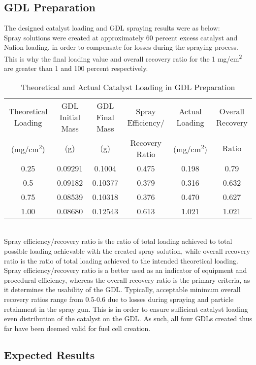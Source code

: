 \documentclass{article}
\begin{document}
	\subsection{GDL Preparation}
	The designed catalyst loading and GDL spraying results were as below:\\
Spray solutions were created at approximately 60 percent excess catalyst and Nafion loading, in order to compensate for losses during the spraying process. This is why the final loading value and overall recovery ratio for the 1 mg/cm\textsuperscript{2} are greater than 1 and 100 percent respectively.
\begin{table}[ht]
\caption{Theoretical and Actual Catalyst Loading in GDL Preparation}
\centering
\begin{tabular}{c c c c c c}
\hline\hline
Theoretical Loading & GDL Initial Mass & GDL Final Mass  & Spray Efficiency/ & Actual Loading & Overall Recovery \\
(mg/cm\textsuperscript{2}) & (g) & (g) & Recovery Ratio & (mg/cm\textsuperscript{2}) & Ratio\\
\hline
0.25 & 0.09291 & 0.1004 & 0.475 & 0.198 & 0.79\\
0.5 & 0.09182 & 0.10377 & 0.379 & 0.316 & 0.632\\
0.75 & 0.08539 & 0.10318 & 0.376 & 0.470 & 0.627\\
1.00 & 0.08680 & 0.12543 & 0.613 & 1.021 & 1.021\\
\hline
\end{tabular}
\label{table:gdlload}
\end{table}\\
Spray efficiency/recovery ratio is the ratio of total loading achieved to total possible loading achievable with the created spray solution, while overall recovery ratio is the ratio of total loading achieved to the intended theoretical loading. Spray efficiency/recovery ratio is a better used as an indicator of equipment and procedural efficiency, whereas the overall recovery ratio is the primary criteria, as it determines the usability of the GDL. Typically, acceptable minimum overall recovery ratios range from 0.5-0.6 due to losses during spraying and particle retainment in the spray gun. This is in order to ensure sufficient catalyst loading even distribution of the catalyst on the GDL. As such, all four GDLs created thus far have been deemed valid for fuel cell creation.
  	\subsection{Expected Results}
\end{document}
